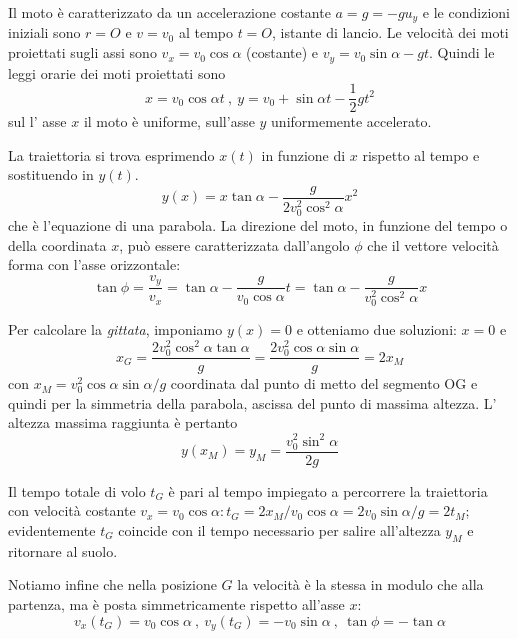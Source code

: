 \documentclass[class=book, crop=false, oneside, 12pt]{standalone}
\begin{document}
Il moto è caratterizzato da un accelerazione costante \(a = g = -g u_y\) e le condizioni iniziali sono \(r = O\) e \(v = v_0\) al tempo \(t = O\), istante di lancio. 
Le velocità dei moti proiettati sugli assi sono \(v_x = v_0 \cos \alpha\) (costante) e \(v_y = v_0 \sin \alpha - g t\). 
Quindi le leggi orarie dei moti proiettati sono
\begin{equation}
  x = v_0 \cos \alpha t \ , \ y = v_0 + \sin \alpha t - \frac{1}{2} g t^2
\end{equation}
sul l' asse \(x\) il moto è uniforme, sull'asse \(y\) uniformemente accelerato.

La traiettoria si trova esprimendo \(x(t)\) in funzione di \(x\) rispetto al tempo e sostituendo in \(y(t)\).
\begin{equation}
  y(x) = x \tan \alpha - \frac{g}{2 v_0^2 \cos^2 \alpha} x^2
\end{equation}
che è l'equazione di una parabola.
La direzione del moto, in funzione del tempo o della coordinata \(x\), può essere caratterizzata dall'angolo \(\phi\) che il vettore velocità forma con l'asse orizzontale: 
\begin{equation}
  \tan \phi = \frac{v_y}{v_x} = \tan \alpha - \frac{g}{v_0 \cos \alpha} t = \tan \alpha - \frac{g}{v_0^2 \cos^2 \alpha} x
\end{equation}

Per calcolare la \emph{gittata}, imponiamo \(y(x) = 0\) e otteniamo due soluzioni: \(x=0\) e
\begin{equation}
  x_{G}=\frac{2 v_{0}^{2} \cos ^{2} \alpha \tan \alpha}{g}=\frac{2 v_{0}^{2} \cos \alpha \sin \alpha}{g}=2 x_{M}
\end{equation}
con \(x_M = v_0^2 \cos \alpha \sin \alpha / g\) coordinata dal punto di metto del segmento OG e quindi per la simmetria della parabola, ascissa del punto di massima altezza. 
L' altezza massima raggiunta è pertanto
\begin{equation}
  y(x_M) = y_M = \frac{v_0^2 \sin^2 \alpha}{2g}
\end{equation} 

Il tempo totale di volo \(t_G\) è pari al tempo impiegato a percorrere la traiettoria con velocità costante \(v_x = v_0 \cos \alpha : t_G = 2 x_M /v_0 \cos \alpha = 2v_0 \sin \alpha / g = 2 t_M\); 
evidentemente \(t_G\) coincide con il tempo necessario per salire all'altezza \(y_M\) e ritornare al suolo. 

Notiamo infine che nella posizione \(G\) la velocità è la stessa in modulo che alla partenza, ma è posta simmetricamente rispetto all'asse \(x\):
\begin{equation}
  v_x(t_G) = v_0 \cos \alpha \ , \ v_y (t_G) = -v_0 \sin \alpha \ , \ \tan \phi = - \tan \alpha
\end{equation}
\end{document}
